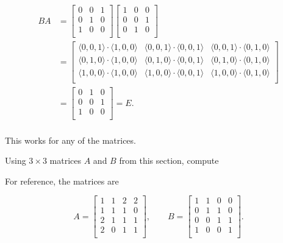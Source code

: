\documentclass[../key.tex]{subfiles}
\begin{document}
\begin{align*}
BA &= \begin{bmatrix}
0 & 0 & 1 \\
0 & 1 & 0 \\
1 & 0 & 0 \\
\end{bmatrix}\begin{bmatrix}
1 & 0 & 0 \\
0 & 0 & 1 \\
0 & 1 & 0 \\
\end{bmatrix} \\
&= \begin{bmatrix}
\langle0,0,1\rangle\cdot \langle1,0,0\rangle & \langle0,0,1\rangle\cdot \langle0,0,1\rangle & \langle0,0,1\rangle\cdot \langle0,1,0\rangle \\
\langle0,1,0\rangle\cdot \langle1,0,0\rangle & \langle0,1,0\rangle\cdot \langle0,0,1\rangle & \langle0,1,0\rangle\cdot \langle0,1,0\rangle \\
\langle1,0,0\rangle\cdot \langle1,0,0\rangle & \langle1,0,0\rangle\cdot \langle0,0,1\rangle & \langle1,0,0\rangle\cdot \langle0,1,0\rangle \\
\end{bmatrix} \\
&= \begin{bmatrix}
0 & 1 & 0 \\
0 & 0 & 1 \\
1 & 0 & 0 \\
\end{bmatrix} = E. \\
\end{align*}

This works for any of the matrices.

\begin{outer_problem}
\item Using $3\times 3$ matrices $A$ and $B$ from this section, compute
\end{outer_problem}

For reference, the matrices are

$$A = \begin{bmatrix}
1 & 1 & 2 & 2 \\
1 & 1 & 1 & 0 \\
2 & 1 & 1 & 1 \\
2 & 0 & 1 & 1 \\
\end{bmatrix},\qquad B = \begin{bmatrix}
1 & 1 & 0 & 0 \\
0 & 1 & 1 & 0 \\
0 & 0 & 1 & 1 \\
1 & 0 & 0 & 1 \\
\end{bmatrix}.$$
\end{document}
